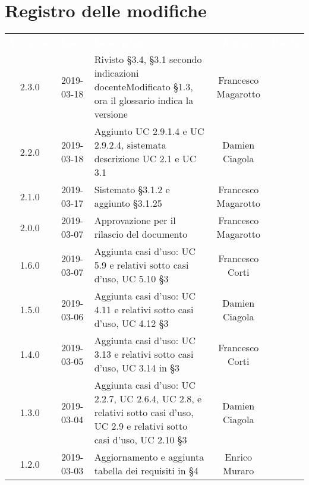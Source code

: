 \section*{Registro delle modifiche}
{
	\renewcommand{\arraystretch}{1.5}
	\centering
	\begin{longtable}{ c c C{6cm} c c }
		\textcolor{white}{\textbf{Versione}} & \textcolor{white}{\textbf{Data}} & \textcolor{white}{\textbf{Descrizione}} & \textcolor{white}{\textbf{Autore}} & \textcolor{white}{\textbf{Ruolo}}\\
		2.3.0 &
		2019-03-18 &
		Rivisto §3.4, §3.1 secondo indicazioni docente\newline Modificato §1.3, ora il glossario indica la versione   &
		Francesco Magarotto &
		\reda{} \\ 
		
		2.2.0 &	
		2019-03-18 &	
		Aggiunto UC 2.9.1.4 e UC 2.9.2.4, sistemata descrizione UC 2.1 e UC 3.1 &
		Damien Ciagola &
		\reda{} \\ 
		
		
		2.1.0 &
		2019-03-17 &
		Sistemato §3.1.2 e aggiunto §3.1.25 &
		Francesco Magarotto &
		\reda{} \\ 
		
		2.0.0 &
		2019-03-07 &
		Approvazione per il rilascio del documento &
		Francesco Magarotto &
		\Res{} \\
		
		1.6.0 &
		2019-03-07 &
		Aggiunta casi d'uso: UC 5.9 e relativi sotto casi d'uso, UC 5.10 §3 &
		Francesco Corti&
		\reda{} \\
		
		1.5.0 &
		2019-03-06 &
		Aggiunta casi d'uso: UC 4.11 e relativi sotto casi d'uso, UC 4.12 §3 &
		Damien Ciagola&
		\reda{} \\
		
		1.4.0 &
		2019-03-05 &
		Aggiunta casi d'uso: UC 3.13 e relativi sotto casi d'uso, UC 3.14 in §3 &
		Francesco Corti&
		\reda{} \\

		1.3.0 &
		2019-03-04 &
		Aggiunta casi d'uso: UC 2.2.7, UC 2.6.4, UC 2.8, e relativi sotto casi d'uso, UC 2.9 e relativi sotto casi d'uso, UC 2.10  §3 &
		Damien Ciagola&
		\reda{} \\
		
		
		1.2.0 &
		2019-03-03 &
		Aggiornamento e aggiunta tabella dei requisiti in §4 &
		Enrico Muraro&
		\reda{} \\
		

\end{longtable}}
